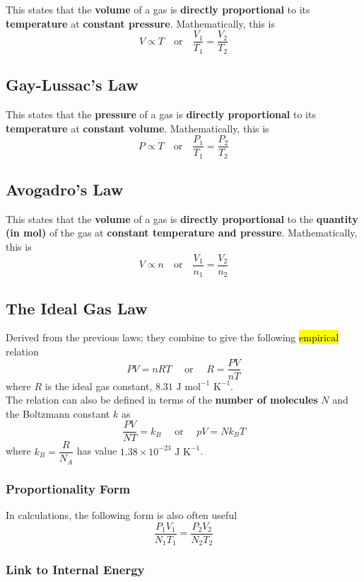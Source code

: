 \documentclass[a4paper,12pt]{article}
\newcommand{\eqor}{\quad \text{or} \quad}
\newcommand{\lb}{\\[8pt]}
\begin{document}
This states that the \textbf{volume} of a gas is \textbf{directly proportional} to its \textbf{temperature} at \textbf{constant pressure}. Mathematically, this is
$$V\propto T \eqor \frac{V_1}{T_1} = \frac{V_2}{T_2}$$

\subsection{Gay-Lussac's Law}

This states that the \textbf{pressure} of a gas is \textbf{directly proportional} to its \textbf{temperature} at \textbf{constant volume}. Mathematically, this is
$$P \propto T  \eqor \frac{P_1}{T_1} = \frac{P_2}{T_2}$$

\subsection{Avogadro's Law}

This states that the \textbf{volume} of a gas is \textbf{directly proportional} to the \textbf{quantity (in mol)} of the gas at \textbf{constant temperature and pressure}. Mathematically, this is
$$V \propto n \eqor \frac{V_1}{n_1} = \frac{V_2}{n_2}$$

\pagebreak

\subsection{The Ideal Gas Law}
Derived from the previous laws; they combine to give the following \hl{empirical} relation
$$PV = nRT \quad \text{ or } \quad R = \frac{PV}{nT}$$
where $R$ is the ideal gas constant, $8.31 \text{ J mol}^{-1} \text{ K}^{-1}$.\lb
The relation can also be defined in terms of the \textbf{number of molecules} $N$ and the Boltzmann constant $k$ as
\begin{equation}\label{eq:ideal_gas}
  \frac{PV}{NT} = k_B \quad \text{ or } \quad pV = Nk_BT
\end{equation}
where $k_B = \dfrac{R}{N_A}$ has value $1.38 \times 10^{-23} \text{ J K}^{-1}$.

\subsubsection{Proportionality Form}
In calculations, the following form is also often useful
$$\frac{P_1V_1}{N_1T_1} = \frac{P_2V_2}{N_2T_2}$$

\subsubsection{Link to Internal Energy}
\end{document}
